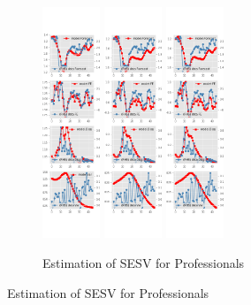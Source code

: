 \documentclass[]{article}
\begin{document}
\begin{figure}[ht]
	\centering
	\begin{subfigure}[b]{\textwidth}
		\centering
		\caption{Estimation of SESV for Professionals}
		\label{SESV_diag_SPF}
		\includegraphics[width=0.19\textwidth]{figures/spf_se_est_sv_diag0.png}
		\includegraphics[width=0.19\textwidth]{figures/spf_se_est_sv_diag1.png}
		\includegraphics[width=0.19\textwidth]{figures/spf_se_est_sv_diag2.png}

\end{subfigure}
\end{figure}
\end{document}
